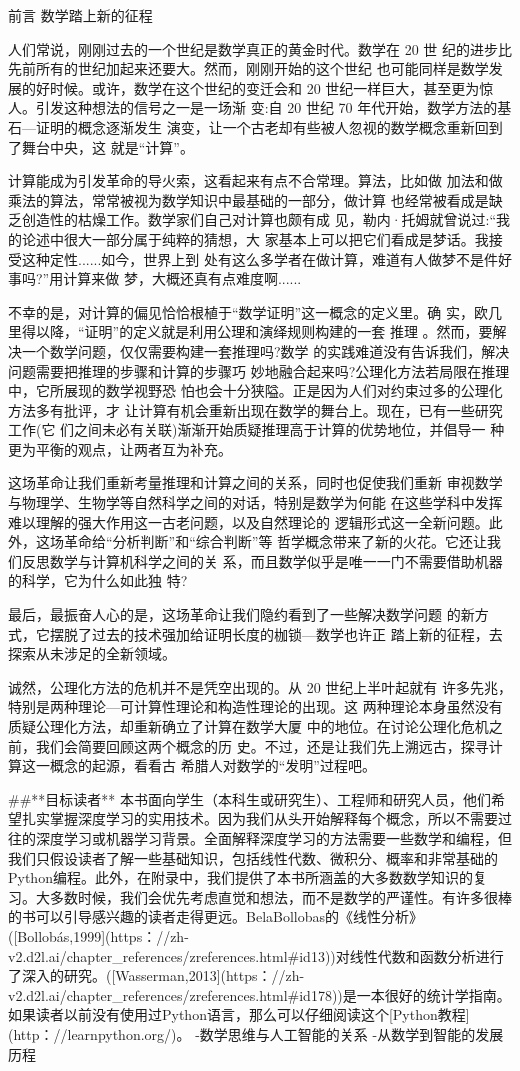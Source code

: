 前言 数学踏上新的征程

人们常说，刚刚过去的一个世纪是数学真正的黄金时代。数学在 20 世 纪的进步比先前所有的世纪加起来还要大。然而，刚刚开始的这个世纪 也可能同样是数学发展的好时候。或许，数学在这个世纪的变迁会和 20 世纪一样巨大，甚至更为惊人。引发这种想法的信号之一是一场渐 变:自 20 世纪 70 年代开始，数学方法的基石---证明的概念逐渐发生 演变，让一个古老却有些被人忽视的数学概念重新回到了舞台中央，这 就是“计算”。

计算能成为引发革命的导火索，这看起来有点不合常理。算法，比如做 加法和做乘法的算法，常常被视为数学知识中最基础的一部分，做计算 也经常被看成是缺乏创造性的枯燥工作。数学家们自己对计算也颇有成 见，勒内·托姆就曾说过:“我的论述中很大一部分属于纯粹的猜想，大 家基本上可以把它们看成是梦话。我接受这种定性......如今，世界上到 处有这么多学者在做计算，难道有人做梦不是件好事吗?”用计算来做 梦，大概还真有点难度啊......

不幸的是，对计算的偏见恰恰根植于“数学证明”这一概念的定义里。确 实，欧几里得以降，“证明”的定义就是利用公理和演绎规则构建的一套 推理 。然而，要解决一个数学问题，仅仅需要构建一套推理吗?数学 的实践难道没有告诉我们，解决问题需要把推理的步骤和计算的步骤巧 妙地融合起来吗?公理化方法若局限在推理中，它所展现的数学视野恐 怕也会十分狭隘。正是因为人们对约束过多的公理化方法多有批评，才 让计算有机会重新出现在数学的舞台上。现在，已有一些研究工作(它 们之间未必有关联)渐渐开始质疑推理高于计算的优势地位，并倡导一 种更为平衡的观点，让两者互为补充。

这场革命让我们重新考量推理和计算之间的关系，同时也促使我们重新 审视数学与物理学、生物学等自然科学之间的对话，特别是数学为何能 在这些学科中发挥难以理解的强大作用这一古老问题，以及自然理论的 逻辑形式这一全新问题。此外，这场革命给“分析判断”和“综合判断”等 哲学概念带来了新的火花。它还让我们反思数学与计算机科学之间的关 系，而且数学似乎是唯一一门不需要借助机器的科学，它为什么如此独 特?

最后，最振奋人心的是，这场革命让我们隐约看到了一些解决数学问题 的新方式，它摆脱了过去的技术强加给证明长度的枷锁---数学也许正 踏上新的征程，去探索从未涉足的全新领域。

诚然，公理化方法的危机并不是凭空出现的。从 20 世纪上半叶起就有 许多先兆，特别是两种理论---可计算性理论和构造性理论的出现。这 两种理论本身虽然没有质疑公理化方法，却重新确立了计算在数学大厦 中的地位。在讨论公理化危机之前，我们会简要回顾这两个概念的历 史。不过，还是让我们先上溯远古，探寻计算这一概念的起源，看看古 希腊人对数学的“发明”过程吧。


##**目标读者**
本书面向学生（本科生或研究生）、工程师和研究人员，他们希望扎实掌握深度学习的实用技术。因为我们从头开始解释每个概念，所以不需要过往的深度学习或机器学习背景。全面解释深度学习的方法需要一些数学和编程，但我们只假设读者了解一些基础知识，包括线性代数、微积分、概率和非常基础的Python编程。此外，在附录中，我们提供了本书所涵盖的大多数数学知识的复习。大多数时候，我们会优先考虑直觉和想法，而不是数学的严谨性。有许多很棒的书可以引导感兴趣的读者走得更远。BelaBollobas的《线性分析》([Bollobás,1999](https：//zh-v2.d2l.ai/chapter_references/zreferences.html#id13))对线性代数和函数分析进行了深入的研究。([Wasserman,2013](https：//zh-v2.d2l.ai/chapter_references/zreferences.html#id178))是一本很好的统计学指南。如果读者以前没有使用过Python语言，那么可以仔细阅读这个[Python教程](http：//learnpython.org/)。
-数学思维与人工智能的关系
-从数学到智能的发展历程